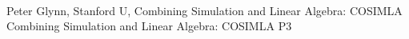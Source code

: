     \\\hline
{}	%
{}		%
{Peter Glynn, Stanford U, Combining Simulation and Linear Algebra: COSIMLA}	%
{Combining Simulation and Linear Algebra: COSIMLA}		%
{P3}		%
\\\hline

